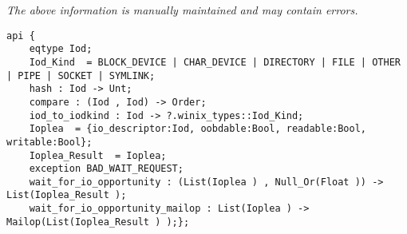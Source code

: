 \label{api:Winix\_Io}

{\tiny \it The above information is manually maintained and may contain errors.}
\begin{verbatim}
api {
    eqtype Iod;
    Iod_Kind  = BLOCK_DEVICE | CHAR_DEVICE | DIRECTORY | FILE | OTHER | PIPE | SOCKET | SYMLINK;
    hash : Iod -> Unt;
    compare : (Iod , Iod) -> Order;
    iod_to_iodkind : Iod -> ?.winix_types::Iod_Kind;
    Ioplea  = {io_descriptor:Iod, oobdable:Bool, readable:Bool, writable:Bool};
    Ioplea_Result  = Ioplea;
    exception BAD_WAIT_REQUEST;
    wait_for_io_opportunity : (List(Ioplea ) , Null_Or(Float )) -> List(Ioplea_Result );
    wait_for_io_opportunity_mailop : List(Ioplea ) -> Mailop(List(Ioplea_Result ) );};
\end{verbatim}
